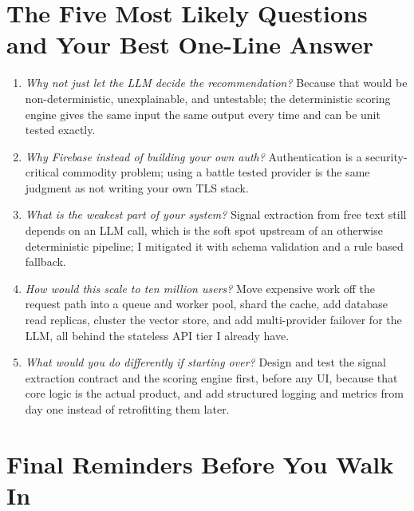 \documentclass[11pt,a4paper]{report}
\begin{document}
\section{The Five Most Likely Questions and Your Best One-Line Answer}

\begin{enumerate}[leftmargin=*]
\item \textit{Why not just let the LLM decide the recommendation?} Because that would be non-deterministic, unexplainable, and untestable; the deterministic scoring engine gives the same input the same output every time and can be unit tested exactly.
\item \textit{Why Firebase instead of building your own auth?} Authentication is a security-critical commodity problem; using a battle tested provider is the same judgment as not writing your own TLS stack.
\item \textit{What is the weakest part of your system?} Signal extraction from free text still depends on an LLM call, which is the soft spot upstream of an otherwise deterministic pipeline; I mitigated it with schema validation and a rule based fallback.
\item \textit{How would this scale to ten million users?} Move expensive work off the request path into a queue and worker pool, shard the cache, add database read replicas, cluster the vector store, and add multi-provider failover for the LLM, all behind the stateless API tier I already have.
\item \textit{What would you do differently if starting over?} Design and test the signal extraction contract and the scoring engine first, before any UI, because that core logic is the actual product, and add structured logging and metrics from day one instead of retrofitting them later.
\end{enumerate}

\section{Final Reminders Before You Walk In}
\end{document}
